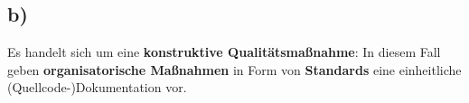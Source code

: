 \subsection*{b)}

Es handelt sich um eine \textbf{konstruktive Qualitätsmaßnahme}: In diesem Fall geben \textbf{organisatorische Maßnahmen} in Form von \textbf{Standards} eine einheitliche (Quellcode-)Dokumentation vor.